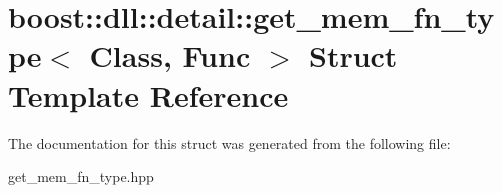 \hypertarget{a00131}{}\section{boost\+:\+:dll\+:\+:detail\+:\+:get\+\_\+mem\+\_\+fn\+\_\+type$<$ Class, Func $>$ Struct Template Reference}
\label{a00131}


The documentation for this struct was generated from the following file\+:\begin{DoxyCompactItemize}
\item 
get\+\_\+mem\+\_\+fn\+\_\+type.\+hpp\end{DoxyCompactItemize}
